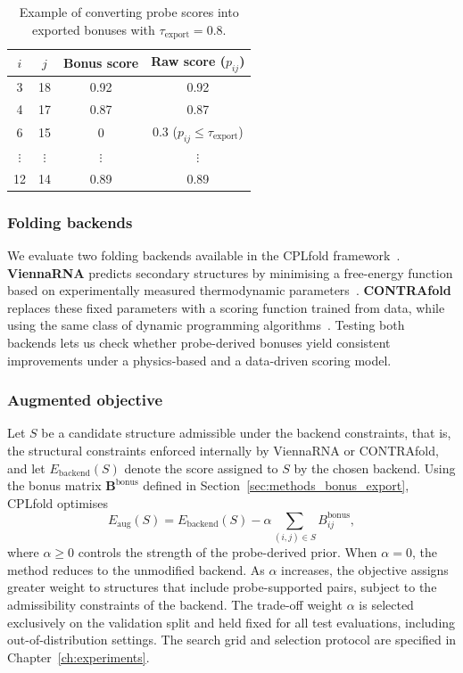 \documentclass[logo,bsc,singlespacing,parskip]{infthesis}
\begin{document}
\begin{table}[H]
\centering
\small
\caption{Example of converting probe scores into exported bonuses with
         $\tau_{\mathrm{export}} = 0.8$.}
\label{tab:bonus_format}
\begin{tabular}{ccc|c}
\toprule
$i$ & $j$ & Bonus score & Raw score ($p_{ij}$) \\
\midrule
3  & 18 & 0.92 & 0.92 \\
4  & 17 & 0.87 & 0.87 \\
6  & 15 & 0   & 0.3 ($p_{ij} \le \tau_{\mathrm{export}}$) \\
$\vdots$ & $\vdots$ & $\vdots$ & $\vdots$ \\
12 & 14 & 0.89 & 0.89 \\
\bottomrule
\end{tabular}
\end{table}
\vspace{-1.5em}

\subsubsection{Folding backends}
\label{sec:methods_backends}

We evaluate two folding backends available in the CPLfold
framework~\citep{wang2026cplfold}. \textbf{ViennaRNA} predicts secondary structures by minimising a free-energy function based
on experimentally measured thermodynamic
parameters~\citep{lorenz2011viennarna,turner2009nndb}.
\textbf{CONTRAfold} replaces these fixed parameters with a scoring
function trained from data, while using the same class of dynamic
programming algorithms~\citep{do2006contrafold}. Testing both backends
lets us check whether probe-derived bonuses yield consistent
improvements under a physics-based and a data-driven scoring model.

\subsubsection{Augmented objective}
\label{sec:methods_aug_obj}
Let $S$ be a candidate structure admissible under the backend constraints, that is, the structural constraints enforced internally by ViennaRNA or CONTRAfold, and let $E_{\mathrm{backend}}(S)$ denote the score assigned to $S$ by the chosen backend. Using the bonus matrix
$\mathbf{B}^{\mathrm{bonus}}$ defined in
Section~\ref{sec:methods_bonus_export}, CPLfold optimises
\begin{equation}
E_{\mathrm{aug}}(S)
=
E_{\mathrm{backend}}(S)
-
\alpha \sum_{(i,j)\in S} B^{\mathrm{bonus}}_{ij},
\label{eq:aug_obj}
\end{equation}
where $\alpha \ge 0$ controls the strength of the probe-derived prior.
When $\alpha = 0$, the method reduces to the unmodified backend. As $\alpha$ increases, the objective assigns greater weight to structures that include probe-supported pairs, subject to the admissibility constraints of the backend.
The trade-off weight $\alpha$ is selected exclusively on the validation
split and held fixed for all test evaluations, including
out-of-distribution settings. The search grid and selection protocol are
specified in Chapter~\ref{ch:experiments}.
\end{document}
